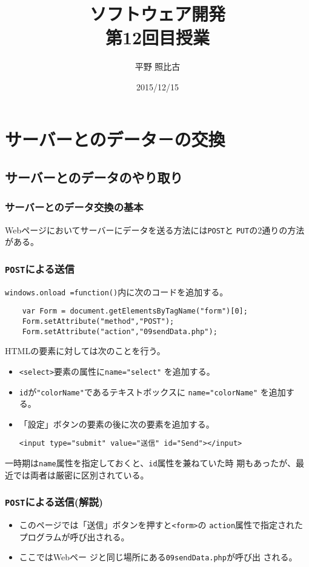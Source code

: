 \documentclass[dvipsk]{beamer}
\title{ソフトウェア開発\\第12回目授業}
\author{平野 照比古}
\institute{}
\date{2015/12/15}
\begin{document}
\frame{\maketitle}
\section{サーバーとのデータ－の交換}
\subsection{サーバーとのデータのやり取り}
\begin{frame}[containsverbatim]
\frametitle{サーバーとのデータ交換の基本}
Webページにおいてサーバーにデータを送る方法には\texttt{POST}と
\texttt{PUT}の2通りの方法がある。
\end{frame}
\begin{frame}[containsverbatim]
\frametitle{\texttt{POST}による送信}
\texttt{windows.onload =function()}内に次のコードを追加する。
\begin{verbatim}
    var Form = document.getElementsByTagName("form")[0];
    Form.setAttribute("method","POST");
    Form.setAttribute("action","09sendData.php");
\end{verbatim}
HTMLの要素に対しては次のことを行う。
\begin{itemize}
 \item \texttt{<select>}要素の属性に\verb+name="select"+ を追加する。
 \item \texttt{id}が\verb+"colorName"+であるテキストボックスに
       \verb+name="colorName"+ を追加する。
 \item 「設定」ボタンの要素の後に次の要素を追加する。
\begin{center}
\verb+<input type="submit" value="送信" id="Send"></input>+ 
\end{center}
\end{itemize}
一時期は\texttt{name}属性を指定しておくと、\texttt{id}属性を兼ねていた時
 期もあったが、最近では両者は厳密に区別されている。
\end{frame}
\begin{frame}[containsverbatim]
\frametitle{\texttt{POST}による送信(解説)}
\begin{itemize}
 \item このページでは「送信」ボタンを押すと\texttt{<form>}の
\texttt{action}属性で指定されたプログラムが呼び出される。
\item ここではWebペー ジと同じ場所にある\texttt{09sendData.php}が呼び出
      される。
\end{itemize}
\end{frame}
\end{document}
